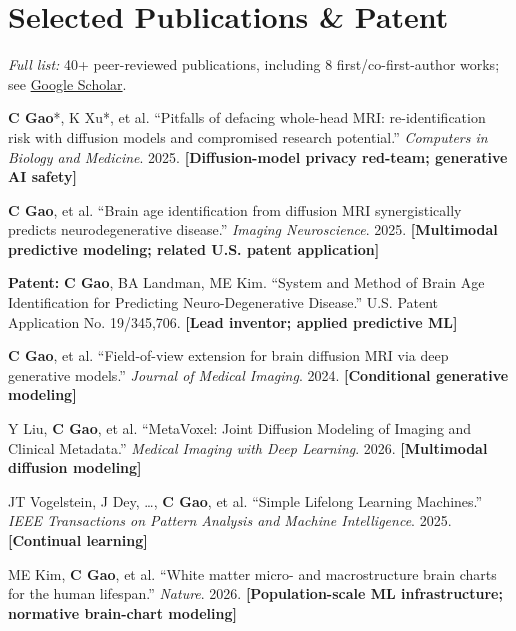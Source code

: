\documentclass[letterpaper,11pt]{article}
\begin{document}
\section{Selected Publications \& Patent}
\small{\textit{Full list:} 40+ peer-reviewed publications, including 8 first/co-first-author works; see \href{https://scholar.google.com/citations?hl=en&user=rKHNyWoAAAAJ&view_op=list_works&sortby=pubdate}{Google Scholar}.}
\begin{enumerate}[label=S\arabic*., leftmargin=0.15 in, itemsep=1pt]
    \small{
    \item{
        \textbf{C Gao}*, K Xu*, et al.
        ``Pitfalls of defacing whole-head MRI: re-identification risk with diffusion models and compromised research potential.''
        \textit{Computers in Biology and Medicine}. 2025.
        \textbf{[Diffusion-model privacy red-team; generative AI safety]}
    }

    \item{
        \textbf{C Gao}, et al.
        ``Brain age identification from diffusion MRI synergistically predicts neurodegenerative disease.''
        \textit{Imaging Neuroscience}. 2025.
        \textbf{[Multimodal predictive modeling; related U.S. patent application]}
    }

    \item{
        \textbf{Patent:} \textbf{C Gao}, BA Landman, ME Kim.
        ``System and Method of Brain Age Identification for Predicting Neuro-Degenerative Disease.''
        U.S. Patent Application No. 19/345,706.
        \textbf{[Lead inventor; applied predictive ML]}
    }

    \item{
        \textbf{C Gao}, et al.
        ``Field-of-view extension for brain diffusion MRI via deep generative models.''
        \textit{Journal of Medical Imaging}. 2024.
        \textbf{[Conditional generative modeling]}
    }

    \item{
        Y Liu, \textbf{C Gao}, et al.
        ``MetaVoxel: Joint Diffusion Modeling of Imaging and Clinical Metadata.''
        \textit{Medical Imaging with Deep Learning}. 2026.
        \textbf{[Multimodal diffusion modeling]}
    }
    
    \item{
        JT Vogelstein, J Dey, \ldots, \textbf{C Gao}, et al.
        ``Simple Lifelong Learning Machines.''
        \textit{IEEE Transactions on Pattern Analysis and Machine Intelligence}. 2025.
        \textbf{[Continual learning]}
    }
        
    \item{
        ME Kim, \textbf{C Gao}, et al.
        ``White matter micro- and macrostructure brain charts for the human lifespan.''
        \textit{Nature}. 2026.
        \textbf{[Population-scale ML infrastructure; normative brain-chart modeling]}
    }
    }
\end{enumerate}

\end{document}
